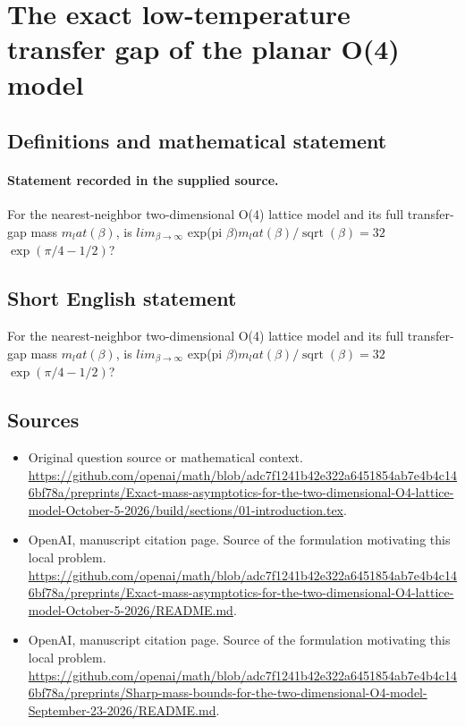 \documentclass[11pt]{article}
\begin{document}
\section*{The exact low-temperature transfer gap of the planar O(4) model}\label{statement}
\subsection{Definitions and mathematical statement}
\paragraph{Statement recorded in the supplied source.}
For the nearest-neighbor two-dimensional O(4) lattice model and its full transfer-gap mass $m_lat(\beta )$, is $lim_{\beta \to \infty }$ exp(pi $\beta )m_lat(\beta )/\operatorname{sqrt}(\beta )=32$ $\exp (\pi /4-1/2)$?
\subsection{Short English statement}
For the nearest-neighbor two-dimensional O(4) lattice model and its full transfer-gap mass $m_lat(\beta )$, is $lim_{\beta \to \infty }$ exp(pi $\beta )m_lat(\beta )/\operatorname{sqrt}(\beta )=32$ $\exp (\pi /4-1/2)$?
\subsection{Sources}
\begin{itemize}
\item[S1] Original question source or mathematical context.
\url{https://github.com/openai/math/blob/adc7f1241b42e322a6451854ab7e4b4c146bf78a/preprints/Exact-mass-asymptotics-for-the-two-dimensional-O4-lattice-model-October-5-2026/build/sections/01-introduction.tex}.
\item[S2] OpenAI, manuscript citation page. Source of the formulation motivating this local problem.
\url{https://github.com/openai/math/blob/adc7f1241b42e322a6451854ab7e4b4c146bf78a/preprints/Exact-mass-asymptotics-for-the-two-dimensional-O4-lattice-model-October-5-2026/README.md}.
\item[S3] OpenAI, manuscript citation page. Source of the formulation motivating this local problem.
\url{https://github.com/openai/math/blob/adc7f1241b42e322a6451854ab7e4b4c146bf78a/preprints/Sharp-mass-bounds-for-the-two-dimensional-O4-model-September-23-2026/README.md}.
\end{itemize}
\end{document}
